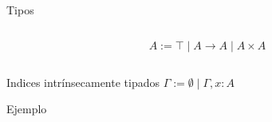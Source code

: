 \begin{frame}{Tipos}
	\begin{columns}
		\begin{column}{0.5\textwidth}
			\[ A := \top \mid A \rightarrow A \mid A \times A \]
			
			
		\end{column}
	\end{columns}
\end{frame}

\begin{frame}{Indices intrínsecamente tipados}
	$\Gamma := \emptyset \mid \Gamma, x:A$
	\pause
\end{frame}

\begin{frame}{Ejemplo}
\end{frame}

